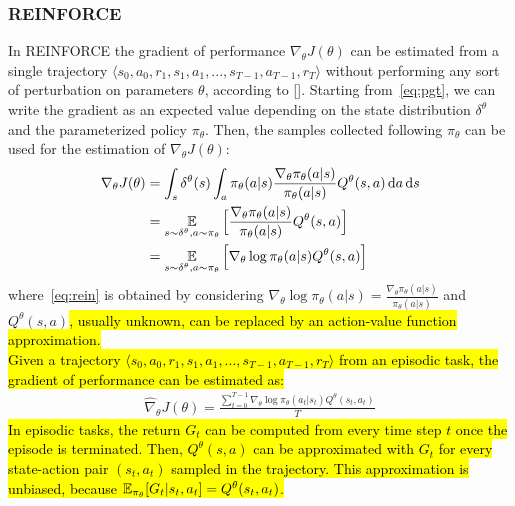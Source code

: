\subsubsection{REINFORCE} \label{subsec:rein}
In REINFORCE the gradient of performance $\nabla_{\theta}J(\theta)$ can be estimated from a single trajectory $\langle s_0, a_0, r_1, s_1, a_1, ..., s_{T-1}, a_{T-1}, r_{T} \rangle$ without performing any sort of perturbation on parameters $\theta$, according to [\citet{Williams1992SimpleSG}]. Starting from~\eqref{eq:pgt}, we can write the gradient as an expected value depending on the state distribution $\delta^{\theta}$ and the parameterized policy $\pi_{\theta}$. Then, the samples collected following $\pi_{\theta}$ can be used for the estimation of $\nabla_{\theta}J(\theta)$: 
\begin{align}
\nabla_{\theta}J(\theta) &= \int_s \delta^{\theta}(s) \int_a \pi_{\theta}(a|s) \frac{\nabla_{\theta} \pi_{\theta}(a|s)}{\pi_{\theta}(a|s)} Q^{\theta}(s,a) \,\mathrm{d} a \,\mathrm{d} s \nonumber\\
&= \operatorname*{\mathbb{E}}_{s \sim \delta^{\theta}, a \sim \pi_{\theta}} \Big[ \frac{\nabla_{\theta} \pi_{\theta}(a|s)}{\pi_{\theta}(a|s)} Q^{\theta}(s,a) \Big] \nonumber\\
&= \operatorname*{\mathbb{E}}_{s \sim \delta^{\theta}, a \sim \pi_{\theta}} \Big[ \nabla_{\theta} \log\pi_{\theta}(a|s) Q^{\theta}(s,a) \Big] \label{eq:rein}
\end{align}
where~\eqref{eq:rein} is obtained by considering $\nabla_{\theta} \log\pi_{\theta}(a|s) = \frac{\nabla_{\theta} \pi_{\theta}(a|s)}{\pi_{\theta}(a|s)}$ and $Q^{\theta}(s, a)$\hl{, usually unknown, can be replaced by an action-value function approximation.}\\
\newline
\hl{Given a trajectory $\langle s_0, a_0, r_1, s_1, a_1, ..., s_{T-1}, a_{T-1}, r_{T} \rangle$ from an episodic task, the gradient of performance can be estimated as:}
\begin{align}
	\widehat{\nabla}_{\theta}J(\theta) = \frac{\sum_{t=0}^{T-1} \nabla_{\theta} \log\pi_{\theta}(a_t|s_t) Q^{\theta}(s_t,a_t)}{T}
\end{align}
\hl{In episodic tasks, the return $G_t$ can be computed from every time step $t$ once the episode is terminated. Then, $Q^{\theta}(s, a)$ can be approximated with $G_{t}$ for every state-action pair $(s_t, a_t)$ sampled in the trajectory. This approximation is unbiased, because $\operatorname*{\mathbb{E}}_{\pi_{\theta}}[G_t | s_t, a_t] = Q^{\theta}(s_t, a_t)$.}\\
\newline
